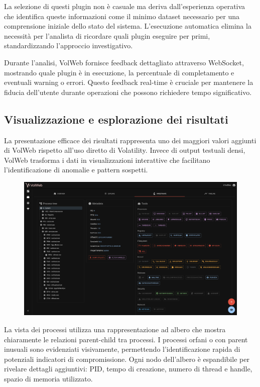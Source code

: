 La selezione di questi plugin non è casuale ma deriva dall'esperienza operativa che identifica queste informazioni come il minimo dataset necessario per una comprensione iniziale dello stato del sistema. L'esecuzione automatica elimina la necessità per l'analista di ricordare quali plugin eseguire per primi, standardizzando l'approccio investigativo.

Durante l'analisi, VolWeb fornisce feedback dettagliato attraverso WebSocket, mostrando quale plugin è in esecuzione, la percentuale di completamento e eventuali warning o errori. Questo feedback real-time è cruciale per mantenere la fiducia dell'utente durante operazioni che possono richiedere tempo significativo.

\subsection{Visualizzazione e esplorazione dei risultati}

La presentazione efficace dei risultati rappresenta uno dei maggiori valori aggiunti di VolWeb rispetto all'uso diretto di Volatility. Invece di output testuali densi, VolWeb trasforma i dati in visualizzazioni interattive che facilitano l'identificazione di anomalie e pattern sospetti.

\begin{figure}[H]
    \centering
    \includegraphics[width=1\linewidth]{images/volweb-original/volweb-process-tree.png}
\end{figure}

La vista dei processi utilizza una rappresentazione ad albero che mostra chiaramente le relazioni parent-child tra processi. I processi orfani o con parent inusuali sono evidenziati visivamente, permettendo l'identificazione rapida di potenziali indicatori di compromissione. Ogni nodo dell'albero è espandibile per rivelare dettagli aggiuntivi: PID, tempo di creazione, numero di thread e handle, spazio di memoria utilizzato.

